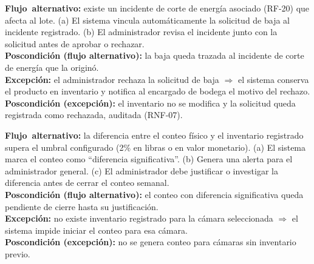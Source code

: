 \documentclass[11pt,a4paper]{article}
\begin{document}
\noindent\textbf{\mbox{Flujo alternativo}:} existe un incidente de corte de energía asociado (RF-20) que afecta al lote. (a) El sistema vincula automáticamente la solicitud de baja al incidente registrado. (b) El administrador revisa el incidente junto con la solicitud antes de aprobar o rechazar.\\
\textbf{Poscondición (flujo alternativo):} la baja queda trazada al incidente de corte de energía que la originó.\\
\noindent\textbf{\mbox{Excepción}:} el administrador rechaza la solicitud de baja $\Rightarrow$ el sistema conserva el producto en inventario y notifica al encargado de bodega el motivo del rechazo.\\
\textbf{Poscondición (excepción):} el inventario no se modifica y la solicitud queda registrada como rechazada, auditada (RNF-07).
\vspace{0.35cm}

\noindent\textbf{\mbox{Flujo alternativo}:} la diferencia entre el conteo físico y el inventario registrado supera el umbral configurado (2\% en libras o en valor monetario). (a) El sistema marca el conteo como ``diferencia significativa''. (b) Genera una alerta para el administrador general. (c) El administrador debe justificar o investigar la diferencia antes de cerrar el conteo semanal.\\
\textbf{Poscondición (flujo alternativo):} el conteo con diferencia significativa queda pendiente de cierre hasta su justificación.\\
\noindent\textbf{\mbox{Excepción}:} no existe inventario registrado para la cámara seleccionada $\Rightarrow$ el sistema impide iniciar el conteo para esa cámara.\\
\textbf{Poscondición (excepción):} no se genera conteo para cámaras sin inventario previo.
\vspace{0.35cm}
\end{document}
